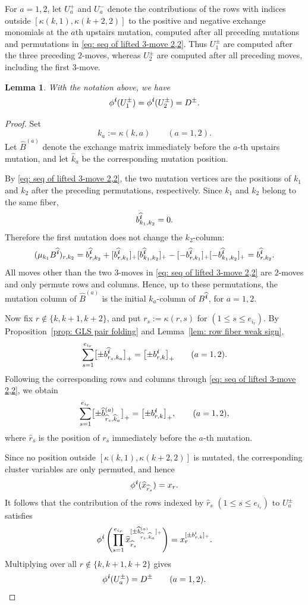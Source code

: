 \documentclass[12pt, leqno]{amsart}
\numberwithin{equation}{section}
\theoremstyle{plain}
\newtheorem{lemma}{Lemma}[section]
\theoremstyle{definition}
\renewcommand{\le}{\leqslant}
\newcommand{\seteq}{\mathbin{:=}}
\newcommand{\ii}{ \textbf{\textit{i}}}
\newcommand{\hb}{\widehat{b}}
\newcommand{\hk}{\widehat{k}}
\newcommand{\hr}{\widehat{r}}
\newcommand{\hx}{\widehat{x}}
\newcommand{\hii}{{\widehat{\ii}}}
\begin{document}
For $a=1,2$, let $U_a^+$ and $U_a^-$ denote the contributions of the   rows with indices outside $[\kappa(k,1),\kappa(k+2,2)]$ 
to the positive and negative exchange monomials  at the $a$th upstairs mutation, computed after all preceding
mutations and permutations in \eqref{eq: seq of lifted 3-move 2,2}.{} Thus $U_1^\pm$ are computed after the three preceding $2$-moves,
whereas $U_2^\pm$ are computed after all preceding moves, including
the first $3$-move.

\begin{lemma}\label{lem: coefficient folding three move}
With the notation above, we have
\[
\phi^\ii(U_1^\pm)=\phi^\ii(U_2^\pm)=D^\pm.
\]
\end{lemma}

\begin{proof}
Set
\[
k_a \seteq \kappa(k,a)\qquad(a=1,2).
\]
Let $\widehat B^{(a)}$ denote the exchange matrix immediately before
the $a$-th upstairs mutation, and let $\hk_a$ be the
corresponding mutation position.

By \eqref{eq: seq of lifted 3-move 2,2}, the two mutation vertices are
the positions of $k_1$ and $k_2$ after the preceding permutations,
respectively. Since $k_1$
and $k_2$ belong to the same fiber,
\[
b^\hii_{k_1,k_2}=0.
\]
Therefore the first mutation does not change the $k_2$-column:
\[
(\mu_{k_1}B^\hii)_{r,k_2}
= b^\hii_{r,k_2} + [b^\hii_{r,k_1}]_+[b^\hii_{k_1,k_2}]_+ - [-b^\hii_{r,k_1}]_+[-b^\hii_{k_1,k_2}]_+
= b^\hii_{r,k_2}.
\]
 All moves other than the two $3$-moves in
\eqref{eq: seq of lifted 3-move 2,2} are $2$-moves and only permute
rows and columns.  Hence, up to these permutations, the mutation
column of $\widehat B^{(a)}$ is the initial $k_a$-column of $B^\hii$,
for $a=1,2$.

Now fix $r\notin\{k,k+1,k+2\}$, and put $r_s \seteq \kappa(r,s)$  for $(1\le s\le e_{i_r})$.
By Proposition~\ref{prop: GLS pair folding} and
Lemma~\ref{lem: row fiber weak sign},
\[
\sum_{s=1}^{e_{i_r}}   \bigl[\pm b^\hii_{r_s,k_a}\bigr]_+   =   \bigl[\pm b^\ii_{r,k}\bigr]_+   \qquad(a=1,2).
\]
Following the corresponding rows and columns through
\eqref{eq: seq of lifted 3-move 2,2}, we obtain
\[
\sum_{s=1}^{e_{i_r}} \bigl[\pm\hb^{(a)}_{\hr_s,\hk_a} \bigr]_+
=\bigl[\pm b^\ii_{r,k}\bigr]_+,   \qquad (a=1,2),
\]
where $\hr_s$ is the position of $r_s$ immediately
before the $a$-th mutation.

Since no position   outside $[\kappa(k,1),\kappa(k+2,2)]$  is mutated, the corresponding
cluster variables are only permuted, and hence
\[
\phi^\ii(\hx_{\hr_s})=x_r.
\]
It follows that  the contribution of the rows indexed by $\hr_s$ $(1\le s\le e_{i_r})$ to
$U_a^\pm$ satisfies
\[
\phi^\ii\left(\prod_{s=1}^{e_{i_r}}\hx_{\hr_s}^{[\pm\hb^{(a)}_{\hr_s,\hk_a}]_+} \right)
= x_r^{[\pm b^\ii_{r,k}]_+}.
\]
Multiplying over all
$r\notin\{k,k+1,k+2\}$ gives
\[
\phi^\ii(U_a^\pm)=D^\pm  \qquad(a=1,2). \qedhere
\]
\end{proof}
\end{document}
